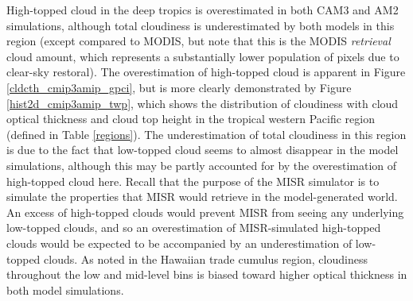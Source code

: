High-topped cloud in the deep tropics is overestimated in both CAM3 and AM2 simulations, although total cloudiness is underestimated by both models in this region (except compared to MODIS, but note that this is the MODIS \emph{retrieval} cloud amount, which represents a substantially lower population of pixels due to clear-sky restoral). The overestimation of high-topped cloud is apparent in Figure \ref{cldcth_cmip3amip_gpci}, but is more clearly demonstrated by Figure \ref{hist2d_cmip3amip_twp}, which shows the distribution of cloudiness with cloud optical thickness and cloud top height in the tropical western Pacific region (defined in Table \ref{regions}). The underestimation of total cloudiness in this region is due to the fact that low-topped cloud seems to almost disappear in the model simulations, although this may be partly accounted for by the overestimation of high-topped cloud here. Recall that the purpose of the MISR simulator is to simulate the properties that MISR would retrieve in the model-generated world. An excess of high-topped clouds would prevent MISR from seeing any underlying low-topped clouds, and so an overestimation of MISR-simulated high-topped clouds would be expected to be accompanied by an underestimation of low-topped clouds. As noted in the Hawaiian trade cumulus region, cloudiness throughout the low and mid-level bins is biased toward higher optical thickness in both model simulations.

